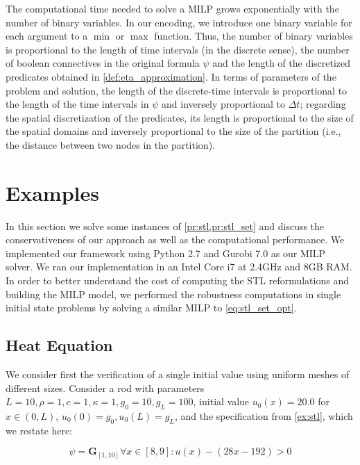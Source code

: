 \documentclass[oribibl]{llncs/llncs}
\newcommand{\Always}{\mathbf{G}}
\begin{document}
The computational time needed to solve a MILP grows exponentially with 
the number of binary variables. In our encoding, we introduce one
binary variable for each argument to a $\min$ or $\max$ function. Thus, the
number of binary variables is proportional to the length of time intervals (in
the discrete sense), the number of boolean connectives in the original formula
$\psi$ and the length of the discretized predicates obtained in
\cref{def:eta_approximation}. In terms of parameters of the problem and solution,
the length of the discrete-time intervals is proportional to the length of the time
intervals in $\psi$ and inversely proportional to $\Delta t$; regarding the
spatial discretization of the predicates, its length is proportional to the size
of the spatial domains and inversely proportional to the size of the partition
(i.e., the distance between two nodes in the partition).

\section{Examples}
\label{sec:examples}

In this section we solve some instances of \cref{pr:stl,pr:stl_set} and discuss
the conservativeness of our approach as well as the computational performance.
We implemented our framework using Python 2.7 and Gurobi 7.0 as our MILP solver.
We ran our implementation in an Intel Core i7 at 2.4GHz and 8GB RAM. In order to
better understand the cost of computing the STL reformulations and building the
MILP model, we performed the robustness computations in single initial state
problems by solving a similar MILP to \cref{eq:stl_set_opt}.

\subsection{Heat Equation}
\label{sub:heat_equation}

We consider first the verification of a single initial value using uniform
meshes of different sizes. Consider a rod with parameters $L = 10, \rho = 1, c =
1, \kappa = 1, g_0 = 10, g_L = 100$, initial value $u_0(x) = 20.0$
for $x \in (0, L)$, $u_0(0) = g_0, u_0(L) = g_L$, and the specification from
\cref{ex:stl}, which we restate here:

\begin{equation}
    \psi = \Always_{[1,10]} \forall x \in [8,9] : u(x) - (28x - 192) > 0
\end{equation}
\end{document}
